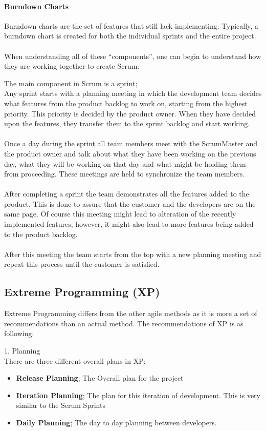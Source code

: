 \paragraph{Burndown Charts}
Burndown charts are the set of features that still lack implementing. Typically, a burndown chart is created for both the individual sprints and the entire project.\\
 \\
When understanding all of these ``components'', one can begin to understand how they are working together to create Scrum:

The main component in Scrum is a sprint; \\
Any sprint starts with a planning meeting in which the development team decides what features from the product backlog to work on, starting from the highest priority. This priority is decided by the product owner. When they have decided upon the features, they transfer them to the sprint backlog and start working. \\
 \\
Once a day during the sprint all team members meet with the ScrumMaster and the product owner and talk about what they have been working on the previous day, what they will be working on that day and what might be holding them from proceeding. These meetings are held to synchronize the team members.\\
 \\
After completing a sprint the team demonstrates all the features added to the product. This is done to assure that the customer and the developers are on the same page. Of course this meeting might lead to alteration of the recently implemented features, however, it might also lead to more features being added to the product backlog.\\
 \\
After this meeting the team starts from the top with a new planning meeting and repeat this process until the customer is satisfied.

\subsection{Extreme Programming (XP)}
Extreme Programming differs from the other agile methods as it is more a set of recommendations than an actual method. The recommendations of XP is as following:

1. Planning\\
There are three different overall plans in XP:
\begin{itemize}
	\item \textbf{Release Planning}; The Overall plan for the project
	\item \textbf{Iteration Planning}; The plan for this iteration of development. This is very similar to the Scrum Sprints
	\item \textbf{Daily Planning}; The day to day planning between developers.
\end{itemize}

